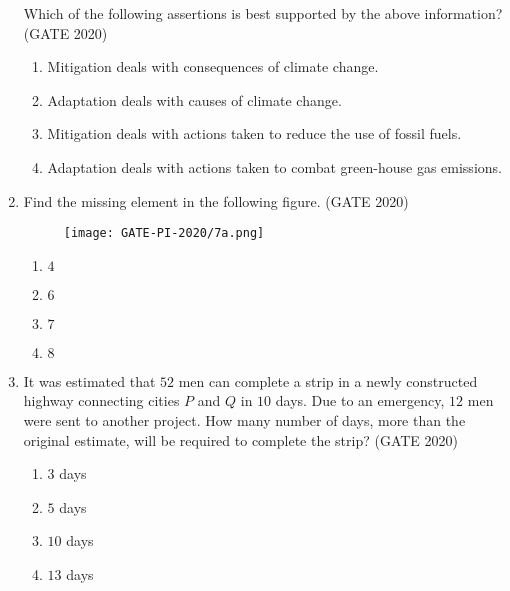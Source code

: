 \documentclass[journal,12pt,onecolumn]{IEEEtran}
\theoremstyle{remark}
\begin{document}
\begin{enumerate}
Which of the following assertions is best supported by the above information?
\hfill{(GATE 2020)}

\begin{enumerate}
    \item Mitigation deals with consequences of climate change.
    \item Adaptation deals with causes of climate change.
    \item Mitigation deals with actions taken to reduce the use of fossil fuels.
    \item Adaptation deals with actions taken to combat green-house gas emissions.
\end{enumerate}

\vspace{1cm}

\item Find the missing element in the following figure.
\hfill{(GATE 2020)}

\begin{figure}[H]
    \centering
    \texttt{[image: GATE-PI-2020/7a.png]} 
    \caption{}
    \label{q7a}
\end{figure}

\begin{multicols}{4}
\begin{enumerate}
    \item $4$
    \item $6$
    \item $7$
    \item $8$
\end{enumerate}
\end{multicols}
\vspace{1cm}

\item It was estimated that $52$ men can complete a strip in a newly constructed highway connecting cities $P$ and $Q$ in $10$ days. Due to an emergency, $12$ men were sent to another project. How many number of days, more than the original estimate, will be required to complete the strip?
\hfill{(GATE 2020)}
\begin{multicols}{4}
\begin{enumerate}
    \item $3$ days
    \item $5$ days
    \item $10$ days
    \item $13$ days
\end{enumerate}
\end{multicols}
\vspace{1cm}


\end{enumerate}
\end{document}
